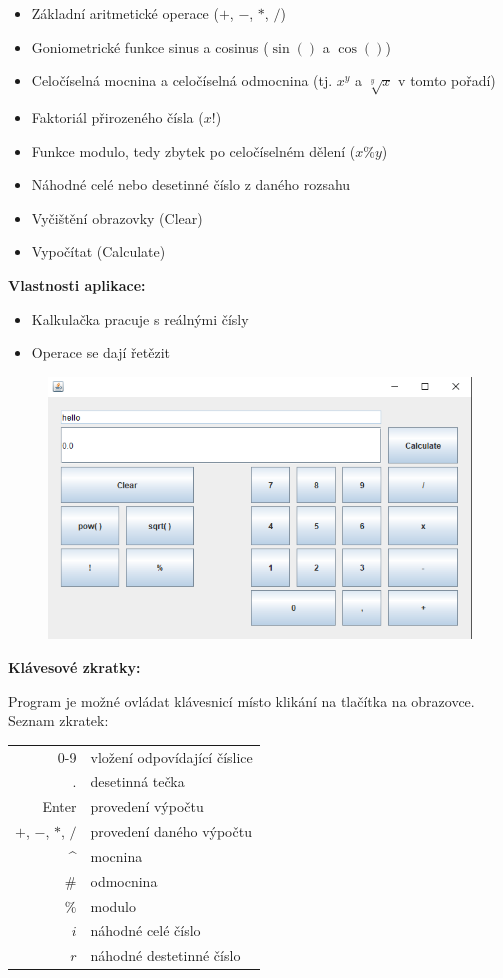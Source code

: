 \documentclass[a4paper, 11pt]{article}
\begin{document}
\begin{itemize}
    \item Základní aritmetické operace ($+$, $-$, $*$, $/$)
    \item Goniometrické funkce sinus a cosinus ($\sin()$ a $\cos()$)
    \item Celočíselná mocnina a celočíselná odmocnina (tj. $x^y$ a $\sqrt[y]{x}$ v tomto pořadí)
    \item Faktoriál přirozeného čísla ($x!$)
    \item Funkce modulo, tedy zbytek po celočíselném dělení ($x\%y$)
    \item Náhodné celé nebo desetinné číslo z daného rozsahu
    \item Vyčištění obrazovky (Clear)
    \item Vypočítat (Calculate)
\end{itemize}

\noindent
\textbf{Vlastnosti aplikace:}

\begin{itemize}
    \item Kalkulačka pracuje s reálnými čísly
    \item Operace se dají řetězit%
\end{itemize}

\begin{figure}[ht]
	\centering
	\includegraphics[width=.7\textwidth]{../screenshot.png}
\end{figure}

\noindent
\textbf{Klávesové zkratky:}

Program je možné ovládat klávesnicí místo klikání na tlačítka na obrazovce. Seznam zkratek:\\

\begin{tabular}{r l}
    0-9 & vložení odpovídající číslice \\
    $.$ & desetinná tečka \\
    Enter & provedení výpočtu \\
    $+$, $-$, $*$, $/$ & provedení daného výpočtu \\
    \^{} & mocnina \\
    $\#$ & odmocnina \\
    $\%$ & modulo \\
    $i$  & náhodné celé číslo \\
    $r$  & náhodné destetinné číslo \\
\end{tabular}
\end{document}
